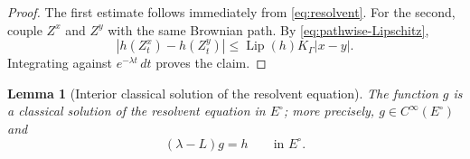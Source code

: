 \documentclass[aihp]{imsart}
\numberwithin{equation}{section}
\theoremstyle{plain}
\newtheorem{lemma}[lemma]{Lemma}
\theoremstyle{definition}
\newcommand{\Lip}{\operatorname{Lip}}
\newcommand{\1}{\mathbf 1}
\newcommand{\abs}[1]{\left\lvert #1\right\rvert}
\begin{document}
\begin{proof}
The first estimate follows immediately from \eqref{eq:resolvent}. For the second, couple $Z^x$ and $Z^y$ with the same Brownian path. By \eqref{eq:pathwise-Lipschitz},
\[
 \abs{h(Z_t^x)-h(Z_t^y)}
 \le \Lip(h)K_\Gamma\abs{x-y}.
\]
Integrating against $e^{-\lambda t}\,dt$ proves the claim.
\end{proof}

\begin{lemma}[Interior classical solution of the resolvent equation]\label{lem:interior-PDE}
The function $g$ is a classical solution of the resolvent equation in $E^\circ$; more precisely, $g\in C^\infty(E^\circ)$ and
\begin{equation}\label{eq:interior-PDE}
 (\lambda-L)g=h
 \qquad\text{in }E^\circ.
\end{equation}
\end{lemma}
\end{document}

